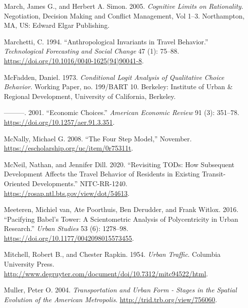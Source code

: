 \documentclass[
  12pt,
]{article}
\newlength{\cslhangindent}
\newlength{\cslentryspacingunit} %
\newenvironment{CSLReferences}[2] %
 {%
  \setlength{\parindent}{0pt}
  \ifodd #1
  \let\oldpar\par
  \def\par{\hangindent=\cslhangindent\oldpar}
  \fi
  \setlength{\parskip}{#2\cslentryspacingunit}
 }%
 {}
\begin{document}
\begin{CSLReferences}{1}{0}
\leavevmode{}%
March, James G., and Herbert A. Simon. 2005. \emph{Cognitive {Limits} on {Rationality}}. Negotiation, Decision Making and Conflict Management, {Vol} 1--3. {Northampton, MA, US}: {Edward Elgar Publishing}.

\leavevmode{}%
Marchetti, C. 1994. {``Anthropological Invariants in Travel Behavior.''} \emph{Technological Forecasting and Social Change} 47 (1): 75--88. \url{https://doi.org/10.1016/0040-1625(94)90041-8}.

\leavevmode{}%
McFadden, Daniel. 1973. \emph{Conditional Logit Analysis of Qualitative Choice Behavior}. Working Paper, no. 199/BART 10. {Berkeley}: {Institute of Urban \& Regional Development, University of California, Berkeley}.

\leavevmode{}%
---------. 2001. {``Economic {Choices}.''} \emph{American Economic Review} 91 (3): 351--78. \url{https://doi.org/10.1257/aer.91.3.351}.

\leavevmode{}%
McNally, Michael G. 2008. {``The {Four Step Model},''} November. \url{https://escholarship.org/uc/item/0r75311t}.

\leavevmode{}%
McNeil, Nathan, and Jennifer Dill. 2020. {``Revisiting {TODs}: {How Subsequent Development Affects} the {Travel Behavior} of {Residents} in {Existing Transit-Oriented Developments}.''} NITC-RR-1240. \url{https://rosap.ntl.bts.gov/view/dot/54613}.

\leavevmode{}%
Meeteren, Michiel van, Ate Poorthuis, Ben Derudder, and Frank Witlox. 2016. {``Pacifying {Babel}'s {Tower}: {A} Scientometric Analysis of Polycentricity in Urban Research.''} \emph{Urban Studies} 53 (6): 1278--98. \url{https://doi.org/10.1177/0042098015573455}.

\leavevmode{}%
Mitchell, Robert B., and Chester Rapkin. 1954. \emph{Urban {Traffic}}. {Columbia University Press}. \url{http://www.degruyter.com/document/doi/10.7312/mitc94522/html}.

\leavevmode{}%
Muller, Peter O. 2004. \emph{Transportation and {Urban Form} - {Stages} in the {Spatial Evolution} of the {American Metropolis}}. \url{http://trid.trb.org/view/756060}.


\end{CSLReferences}
\end{document}

